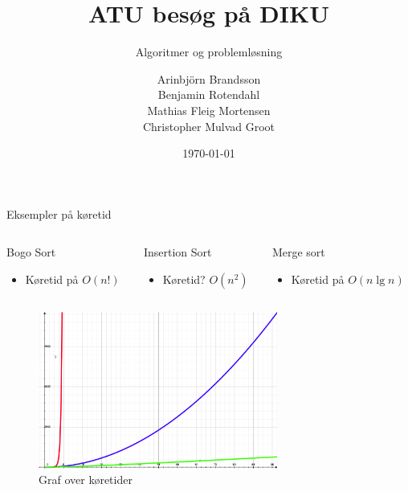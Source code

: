 \documentclass[12pt,t]{beamer}
\title{ATU besøg på DIKU}
\subtitle{Algoritmer og problemløsning}
\author{
        Arinbjörn Brandsson \\
        Benjamin Rotendahl  \\
        Mathias Fleig Mortensen \\
        Christopher Mulvad Groot
}
\date[]{\today}
\begin{document}
\frame[plain]{\titlepage}

\begin{frame}[t]{Eksempler på køretid}
    \vspace{-2em}
    \begin{columns}
        \begin{column}{0.33\textwidth}
            \begin{block}{Bogo Sort}
                \begin{itemize}
                    \item Køretid på $O(n!)$
                \end{itemize}
            \end{block}
        \end{column}
        \begin{column}{0.33\textwidth}
            \begin{block}{Insertion Sort}
                \begin{itemize}
                    \item Køretid? $O(n^2)$
                \end{itemize}
            \end{block}
        \end{column}

        \begin{column}{0.33\textwidth}
            \begin{block}{Merge sort}
                \begin{itemize}
                    \item Køretid på $O(n \lg n)$
                \end{itemize}
            \end{block}
        \end{column}
    \end{columns}
    \begin{figure}[h!]
        \caption{Graf over køretider}
        \centering
        \includegraphics[width=0.7\textwidth]{./include/exs.png}
    \end{figure}
\end{frame}
\end{document}

